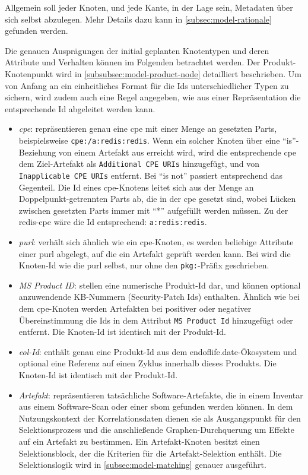 Allgemein soll jeder Knoten, und jede Kante, in der Lage sein, Metadaten über sich selbst abzulegen.
Mehr Details dazu kann in \autoref{subsec:model-rationale} gefunden werden.

Die genauen Ausprägungen der initial geplanten Knotentypen und deren Attribute und Verhalten können im Folgenden betrachtet werden.
Der Produkt-Knotenpunkt wird in \autoref{subsubsec:model-product-node} detailliert beschrieben.
Um von Anfang an ein einheitliches Format für die Ids unterschiedlicher Typen zu sichern, wird zudem auch eine Regel angegeben, wie aus einer Repräsentation die entsprechende Id abgeleitet werden kann.

\begin{itemize}
    \itemsep0em
    \item \textit{\acrshort{cpe}}: repräsentieren genau eine \acrshort{cpe} mit einer Menge an gesetzten Parts, beispielsweise \texttt{cpe:/a:redis:redis}.
    Wenn ein solcher Knoten über eine \enquote{is}-Beziehung von einem Artefakt aus erreicht wird, wird die entsprechende \acrshort{cpe} dem Ziel-Artefakt als \texttt{Additional CPE URIs} hinzugefügt, und von \texttt{Inapplicable CPE URIs} entfernt.
    Bei \enquote{is not} passiert entsprechend das Gegenteil.
    Die Id eines \acrshort{cpe}-Knotens leitet sich aus der Menge an Doppelpunkt-getrennten Parts ab, die in der \acrshort{cpe} gesetzt sind, wobei Lücken zwischen gesetzten Parts immer mit \enquote{*} aufgefüllt werden müssen.
    Zu der redis-\acrshort{cpe} wäre die Id entsprechend: \texttt{a:redis:redis}.
    \item \textit{\acrshort{purl}}: verhält sich ähnlich wie ein \acrshort{cpe}-Knoten, es werden beliebige Attribute einer \acrshort{purl} abgelegt, auf die ein Artefakt geprüft werden kann.
    Bei  wird die Knoten-Id wie die \acrshort{purl} selbst, nur ohne den \texttt{pkg:}-Präfix geschrieben.
    \item \textit{MS Product ID}: stellen eine numerische Produkt-Id dar, und können optional anzuwendende KB-Nummern (Security-Patch Ids) enthalten.
    Ähnlich wie bei dem \acrshort{cpe}-Knoten werden Artefakten bei positiver oder negativer Übereinstimmung die Ids in dem Attribut \texttt{MS Product Id} hinzugefügt oder entfernt.
    Die Knoten-Id ist identisch mit der Produkt-Id.
    \item \textit{\acrshort{eol}-Id}: enthält genau eine Produkt-Id aus dem endoflife.date-Ökosystem und optional eine Referenz auf einen Zyklus innerhalb dieses Produkts.
    Die Knoten-Id ist identisch mit der Produkt-Id.
    \item \textit{Artefakt}: repräsentieren tatsächliche Software-Artefakte, die in einem Inventar aus einem Software-Scan oder einer \acrshort{sbom} gefunden werden können.
    In dem Nutzungskontext der Korrelationsdaten dienen sie als Ausgangspunkt für den Selektionsprozess und die anschließende Graphen-Durchquerung um Effekte auf ein Artefakt zu bestimmen.
    Ein Artefakt-Knoten besitzt einen Selektionsblock, der die Kriterien für die Artefakt-Selektion enthält.
    Die Selektionslogik wird in \autoref{subsec:model-matching} genauer ausgeführt.
\end{itemize}

